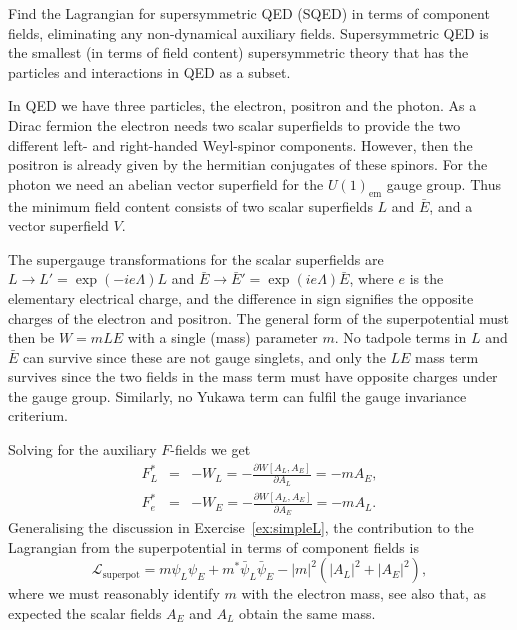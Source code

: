 \documentclass[notes.tex]{subfiles}
\begin{document}
\begin{Exercise}[]
\label{ex:SQED}
Find the Lagrangian for supersymmetric QED (SQED) in terms of component fields, eliminating any non-dynamical auxiliary fields. Supersymmetric QED is the smallest  (in terms of field content) supersymmetric theory that has the particles and interactions in QED as a subset.
\end{Exercise}

\begin{Answer}
In QED we have three particles, the electron, positron and the photon. As a Dirac fermion the electron needs two scalar superfields to provide the two different left- and right-handed Weyl-spinor components. However, then the positron is already given by the hermitian conjugates of these spinors. For the photon we need an abelian vector superfield for the $U(1)_{\text{em}}$ gauge group. Thus the minimum field content consists of two scalar superfields $L$ and $\bar E$, and a vector superfield $V$. 

The supergauge transformations for the scalar superfields are $L\to L'=\exp{(-ie\Lambda)}L$  and $\bar E\to \bar E'=\exp{(ie\Lambda)}\bar E$, where $e$ is the elementary electrical charge, and the difference in sign signifies the opposite charges of the electron and positron. The general form of the superpotential must then be $W=mLE$ with a single (mass) parameter $m$. No tadpole terms in $L$ and $\bar E$ can survive since these are not gauge singlets, and only the $LE$ mass term survives since the two fields in the mass term must have opposite charges under the gauge group. Similarly, no Yukawa term can fulfil the gauge invariance criterium. 

Solving for the auxiliary $F$-fields we  get
\begin{eqnarray}
F_L^* &=& -W_L = -\frac{\partial W[A_L,A_E]}{\partial A_L}= -mA_E, \nonumber \\
F_e^* &=& -W_E = -\frac{\partial W[A_L,A_E]}{\partial A_E}= -mA_L. \nonumber
\end{eqnarray}
Generalising the discussion in Exercise~\ref{ex:simpleL}, the contribution to the Lagrangian from the superpotential in terms of component fields is
\begin{equation}
\mathcal L_\text{superpot} = m\psi_L\psi_E+m^*\bar\psi_L\bar\psi_E-|m|^2(|A_L|^2+|A_E|^2),
\end{equation}
where we must reasonably identify $m$ with the electron mass, see also that, as expected the scalar fields $A_E$ and $A_L$ obtain the same mass.


\end{Answer}
\end{document}
